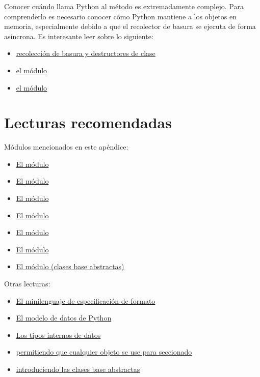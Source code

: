 Conocer cuándo llama Python al método  es extremadamente complejo. Para comprenderlo es necesario conocer cómo Python mantiene a los objetos en memoria, especialmente debido a que el recolector de basura se ejecuta de forma asíncrona. Es interesante leer sobre lo siguiente:

\begin{itemize}
  \item \href{http://www.electricmonk.nl/log/2008/07/07/python-destructor-and-garbage-collection-notes/}{recolección de basura y destructores de clase}
  \item \href{https://docs.python.org/3.5/library/weakref.html}{el módulo }
  \item \href{https://docs.python.org/3/library/gc.html}{el módulo }
\end{itemize}

\section{Lecturas recomendadas}

Módulos mencionados en este apéndice:

\begin{itemize}
  \item \href{https://docs.python.org/3.1/library/zipfile.html}{El módulo }
  \item \href{https://docs.python.org/3.1/library/cgi.html}{El módulo }
  \item \href{http://www.python.org/doc/3.1/library/collections.html}{El módulo }
  \item \href{http://docs.python.org/3.1/library/math.html}{El módulo }
  \item \href{http://docs.python.org/3.1/library/pickle.html}{El módulo }
  \item \href{http://docs.python.org/3.1/library/copy.html}{El módulo }
  \item \href{http://docs.python.org/3.1/library/abc.html}{El módulo (clases base abstractas)}
\end{itemize}

Otras lecturas:

\begin{itemize}
  \item \href{https://docs.python.org/3/library/string.html#formatspec}{El minilenguaje de especificación de formato}
  \item \href{https://docs.python.org/3/reference/datamodel.html}{El modelo de datos de Python}
  \item \href{https://docs.python.org/3/library/stdtypes.html}{Los tipos internos de datos}
  \item \href{http://www.python.org/dev/peps/pep-0357/}{ permitiendo que cualquier objeto se use para seccionado}
  \item \href{https://www.python.org/dev/peps/pep-3119/}{ introduciendo las clases base abstractas}
\end{itemize}


